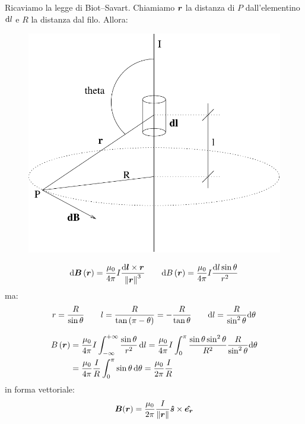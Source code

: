 \begin{Es}
\label{Es:filo_infinito}
Ricaviamo la legge di Biot--Savart. Chiamiamo $\boldsymbol{r}$ la distanza di $P$ dall'elementino $\mathrm{d} l$ e $R$ la distanza dal filo. Allora:
\begin{figure}[htbp]
\centering
\includegraphics[scale=0.5]{immagini/fisica2/magneto_filo}
\end{figure}
\begin{equation*}\mathrm{d} \boldsymbol{B}\left(\boldsymbol{r}\right)=\frac{\mu_0}{4\pi}I\frac{\mathrm{d}\boldsymbol{l}\times\boldsymbol{r}}{\left\lVert\boldsymbol{r}\right\rVert^3}\qquad\mathrm{d} B\left(\boldsymbol{r}\right)=\frac{\mu_0}{4\pi}I\frac{\mathrm{d} l\sin\theta}{r^2}\end{equation*}
ma:
\begin{equation*}r=\frac{R}{\sin\theta}\qquad l=\frac{R}{\tan\left(\pi-\theta\right)}=-\frac{R}{\tan\theta}\qquad \mathrm{d} l=\frac{R}{\sin^2\theta}\mathrm{d}\theta\end{equation*}
\end{Es}
\begin{align*}
B\left(\boldsymbol{r}\right)&=\frac{\mu_0}{4\pi}I\int_{-\infty}^{+\infty}\frac{\sin\theta}{r^2}\,\mathrm{d} l=\frac{\mu_0}{4\pi}I\int_{0}^{\pi}\frac{\sin\theta\sin^2\theta}{R^2}\frac{R}{\sin^2\theta}\mathrm{d}\theta\\
&=\frac{\mu_0}{4\pi}\frac{I}{R}\int_0^\pi\sin\theta\,\mathrm{d}\theta=\frac{\mu_0}{2\pi}\frac{I}{R}
\end{align*}
in forma vettoriale:
\begin{equation}
\boldsymbol{B}(\boldsymbol{r})=\frac{\mu_0}{2\pi}\frac{I}{\left\lVert\boldsymbol{r}\right\rVert}\boldsymbol{\hat {s}}\times{\boldsymbol{\hat {e_r}}}
\end{equation}

